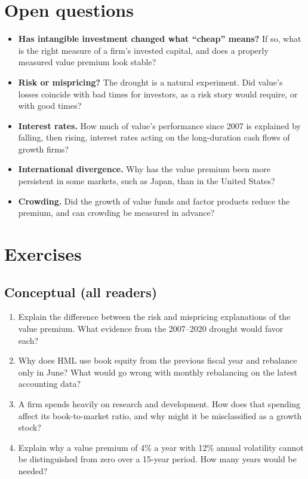 \section{Open questions}
\label{sec:08-open}

\begin{itemize}
  \item \textbf{Has intangible investment changed what ``cheap'' means?} If so, what is the right measure of a firm's invested capital, and does a properly measured value premium look stable?
  \item \textbf{Risk or mispricing?} The drought is a natural experiment. Did value's losses coincide with bad times for investors, as a risk story would require, or with good times?
  \item \textbf{Interest rates.} How much of value's performance since 2007 is explained by falling, then rising, interest rates acting on the long-duration cash flows of growth firms?
  \item \textbf{International divergence.} Why has the value premium been more persistent in some markets, such as Japan, than in the United States?
  \item \textbf{Crowding.} Did the growth of value funds and factor products reduce the premium, and can crowding be measured in advance?
\end{itemize}

\section*{Exercises}

\subsection*{Conceptual (all readers)}

\begin{enumerate}
  \item Explain the difference between the risk and mispricing explanations of the value premium. What evidence from the 2007--2020 drought would favor each?
  \item Why does HML use book equity from the previous fiscal year and rebalance only in June? What would go wrong with monthly rebalancing on the latest accounting data?
  \item A firm spends heavily on research and development. How does that spending affect its book-to-market ratio, and why might it be misclassified as a growth stock?
  \item Explain why a value premium of 4\% a year with 12\% annual volatility cannot be distinguished from zero over a 15-year period. How many years would be needed?
\end{enumerate}

